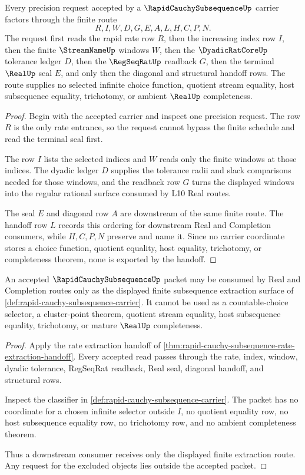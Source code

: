 \begin{theorem}
\label{thm:rapid-cauchy-subsequence-rate-extraction-handoff}
Every precision request accepted by a $\RapidCauchySubsequenceUp$ carrier factors through the finite route
$$
R,I,W,D,G,E,A,L,H,C,P,N .
$$
The request first reads the rapid rate row $R$, then the increasing index row $I$, then the finite $\StreamNameUp$ windows $W$, then the $\DyadicRatCoreUp$ tolerance ledger $D$, then the $\RegSeqRatUp$ readback $G$, then the terminal $\RealUp$ seal $E$, and only then the diagonal and structural handoff rows. The route supplies no selected infinite choice function, quotient stream equality, host subsequence equality, trichotomy, or ambient $\RealUp$ completeness.
\end{theorem}
\begin{proof}
Begin with the accepted carrier and inspect one precision request. The row $R$ is the only rate entrance, so the request cannot bypass the finite schedule and read the terminal seal first.

The row $I$ lists the selected indices and $W$ reads only the finite windows at those indices. The dyadic ledger $D$ supplies the tolerance radii and slack comparisons needed for those windows, and the readback row $G$ turns the displayed windows into the regular rational surface consumed by L10 Real routes.

The seal $E$ and diagonal row $A$ are downstream of the same finite route. The handoff row $L$ records this ordering for downstream Real and Completion consumers, while $H,C,P,N$ preserve and name it. Since no carrier coordinate stores a choice function, quotient equality, host equality, trichotomy, or completeness theorem, none is exported by the handoff.
\end{proof}

\begin{theorem}
\label{thm:rapid-cauchy-subsequence-nonchoice-boundary}
An accepted $\RapidCauchySubsequenceUp$ packet may be consumed by Real and Completion routes only as the displayed finite subsequence extraction surface of \autoref{def:rapid-cauchy-subsequence-carrier}. It cannot be used as a countable-choice selector, a cluster-point theorem, quotient stream equality, host subsequence equality, trichotomy, or mature $\RealUp$ completeness.
\end{theorem}
\begin{proof}
Apply the rate extraction handoff of \autoref{thm:rapid-cauchy-subsequence-rate-extraction-handoff}. Every accepted read passes through the rate, index, window, dyadic tolerance, RegSeqRat readback, Real seal, diagonal handoff, and structural rows.

Inspect the classifier in \autoref{def:rapid-cauchy-subsequence-carrier}. The packet has no coordinate for a chosen infinite selector outside $I$, no quotient equality row, no host subsequence equality row, no trichotomy row, and no ambient completeness theorem.

Thus a downstream consumer receives only the displayed finite extraction route. Any request for the excluded objects lies outside the accepted packet.
\end{proof}

